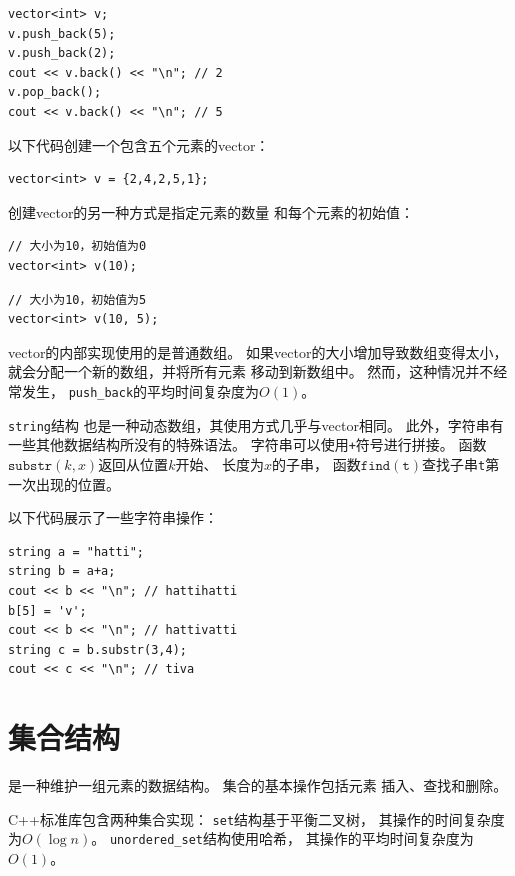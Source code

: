 \begin{lstlisting}
vector<int> v;
v.push_back(5);
v.push_back(2);
cout << v.back() << "\n"; // 2
v.pop_back();
cout << v.back() << "\n"; // 5
\end{lstlisting}

以下代码创建一个包含五个元素的vector：

\begin{lstlisting}
vector<int> v = {2,4,2,5,1};
\end{lstlisting}

创建vector的另一种方式是指定元素的数量
和每个元素的初始值：

\begin{lstlisting}
// 大小为10，初始值为0
vector<int> v(10);
\end{lstlisting}
\begin{lstlisting}
// 大小为10，初始值为5
vector<int> v(10, 5);
\end{lstlisting}

vector的内部实现使用的是普通数组。
如果vector的大小增加导致数组变得太小，
就会分配一个新的数组，并将所有元素
移动到新数组中。
然而，这种情况并不经常发生，
\texttt{push\_back}的平均时间复杂度为$O(1)$。


\texttt{string}结构
也是一种动态数组，其使用方式几乎与vector相同。
此外，字符串有一些其他数据结构所没有的特殊语法。
字符串可以使用\texttt{+}符号进行拼接。
函数$\texttt{substr}(k,x)$返回从位置$k$开始、
长度为$x$的子串，
函数$\texttt{find}(\texttt{t})$查找子串\texttt{t}第一次出现的位置。

以下代码展示了一些字符串操作：

\begin{lstlisting}
string a = "hatti";
string b = a+a;
cout << b << "\n"; // hattihatti
b[5] = 'v';
cout << b << "\n"; // hattivatti
string c = b.substr(3,4);
cout << c << "\n"; // tiva
\end{lstlisting}

\section{集合结构}


是一种维护一组元素的数据结构。
集合的基本操作包括元素
插入、查找和删除。

C++标准库包含两种集合实现：
\texttt{set}结构基于平衡二叉树，
其操作的时间复杂度为$O(\log n)$。
\texttt{unordered\_set}结构使用哈希，
其操作的平均时间复杂度为$O(1)$。


